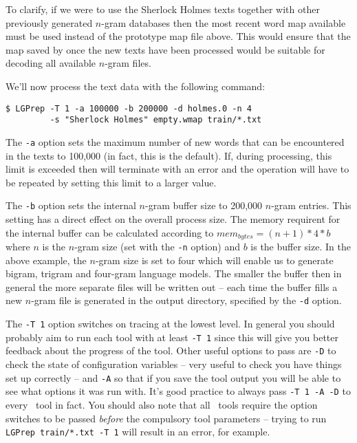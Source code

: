 To clarify, if we were to use the Sherlock Holmes texts together with
other previously generated $n$-gram databases then the most recent
word map available must be used instead of the prototype map file
above. This would ensure that the map saved by  once the
new texts have been processed would be suitable for decoding all
available $n$-gram files.

We'll now process the text data with the following command:
\begin{verbatim}
$ LGPrep -T 1 -a 100000 -b 200000 -d holmes.0 -n 4 
         -s "Sherlock Holmes" empty.wmap train/*.txt
\end{verbatim} %

The \texttt{-a} option sets the maximum number of new words that can
be encountered in the texts to 100,000 (in fact, this is the default).
If, during processing, this limit is exceeded then  will
terminate with an error and the operation will have to be repeated by
setting this limit to a larger value.

The \texttt{-b} option sets the internal $n$-gram buffer size to
200,000 $n$-gram entries. This setting has a direct effect on the
overall process size. The memory requirent for the internal buffer can
be calculated according to $mem_{bytes} = (n+1)*4*b$ where $n$ is the
$n$-gram size (set with the \texttt{-n} option) and $b$ is the buffer
size.  In the above example, the $n$-gram size is set to four which
will enable us to generate bigram, trigram and four-gram language
models.  The smaller the buffer then in general the more separate
files will be written out -- each time the buffer fills a new $n$-gram
file is generated in the output directory, specified by the {\tt -d}
option.

The {\tt -T 1} option switches on tracing at the lowest level.  In
general you should probably aim to run each tool with at least {\tt -T
1} since this will give you better feedback about the progress of the
tool.  Other useful options to pass are {\tt -D} to check the state of
configuration variables -- very useful to check you have things set up
correctly -- and {\tt -A} so that if you save the tool output you will
be able to see what options it was run with.  It's good practice to
always pass {\tt -T 1 -A -D} to every \HTK\ tool in fact.  You should
also note that all \HTK\ tools require the option switches to be
passed {\it before} the compulsory tool parameters -- trying to run
{\tt LGPrep train/*.txt -T 1} will result in an error, for example.

